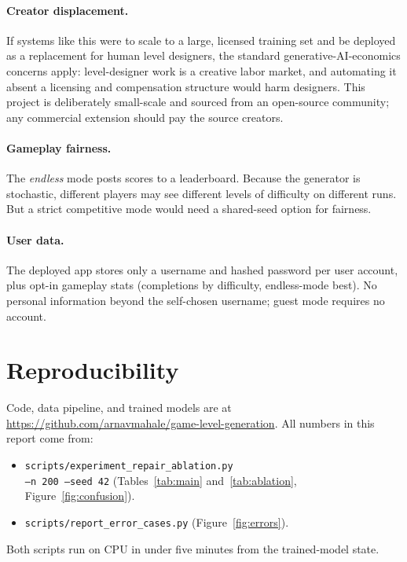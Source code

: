 \documentclass[11pt]{article}
\begin{document}
\paragraph{Creator displacement.}
If systems like this were to scale to a large, licensed training set
and be deployed as a replacement for human level designers, the
standard generative-AI-economics concerns apply: level-designer work
is a creative labor market, and automating it absent a licensing and
compensation structure would harm designers. This project is
deliberately small-scale and sourced from an open-source community;
any commercial extension should pay the source creators.

\paragraph{Gameplay fairness.}
The \emph{endless} mode posts scores to a leaderboard. Because the
generator is stochastic, different players may see different levels
of difficulty on different runs. But a strict competitive mode would need
a shared-seed option for fairness.

\paragraph{User data.}
The deployed app stores only a username and hashed password per user
account, plus opt-in gameplay stats (completions by difficulty,
endless-mode best). No personal information beyond the self-chosen username; guest
mode requires no account.

\section*{Reproducibility}

Code, data pipeline, and trained models are at\\
\url{https://github.com/arnavmahale/game-level-generation}.
All numbers in this report come from:
\begin{itemize}
    \item \texttt{scripts/experiment\_repair\_ablation.py\\ --n 200 --seed 42}
    (Tables~\ref{tab:main} and~\ref{tab:ablation}, Figure~\ref{fig:confusion}).
    \item \texttt{scripts/report\_error\_cases.py} (Figure~\ref{fig:errors}).
\end{itemize}
Both scripts run on CPU in under five minutes from the trained-model
state.



\end{document}
